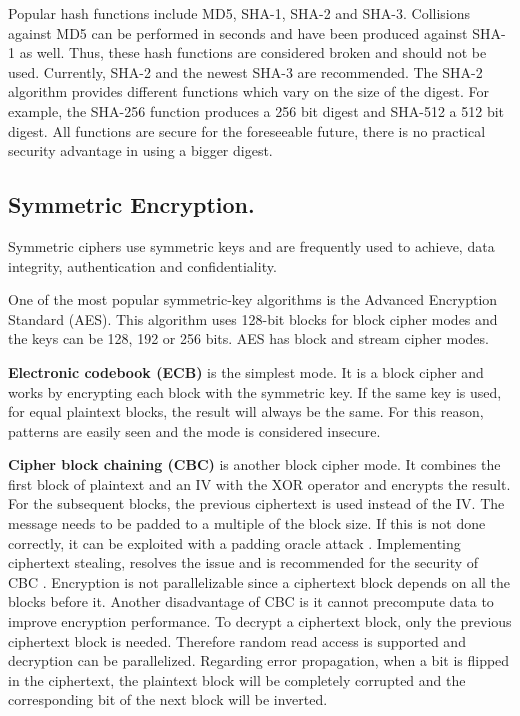 Popular hash functions include MD5, SHA-1, SHA-2 and SHA-3. Collisions against MD5 can be performed in seconds and have been produced against SHA-1 as well. Thus, these hash functions are considered broken and should not be used. Currently, SHA-2 and the newest SHA-3 are recommended. The SHA-2 algorithm provides different functions which vary on the size of the digest. For example, the SHA-256 function produces a 256 bit digest and SHA-512 a 512 bit digest. All functions are secure for the foreseeable future, there is no practical security advantage in using a bigger digest.

\subsection{Symmetric Encryption.}  \label{crypto:symmetric}

Symmetric ciphers use symmetric keys and are frequently used to achieve, data integrity, authentication and confidentiality.

One of the most popular symmetric-key algorithms is the Advanced Encryption Standard (AES). This algorithm uses 128-bit blocks for block cipher modes and the keys can be 128, 192 or 256 bits. AES has block and stream cipher modes.

\textbf{Electronic codebook (ECB)} is the simplest mode. It is a block cipher and works by encrypting each block with the symmetric key. If the same key is used, for equal plaintext blocks, the result will always be the same. For this reason, patterns are easily seen and the mode is considered insecure.

\textbf{Cipher block chaining (CBC)} is another block cipher mode. It combines the first block of plaintext and an IV with the XOR operator and encrypts the result. For the subsequent blocks, the previous ciphertext is used instead of the IV. The message needs to be padded to a multiple of the block size. If this is not done correctly, it can be exploited with a padding oracle attack \cite{paddingoracle}. Implementing ciphertext stealing, resolves the issue and is recommended for the security of CBC \cite{ciphertextstealing}.
Encryption is not parallelizable since a ciphertext block depends on all the blocks before it. Another disadvantage of CBC is it cannot precompute data to improve encryption performance.
To decrypt a ciphertext block, only the previous ciphertext block is needed. Therefore random read access is supported and decryption can be parallelized.
Regarding error propagation, when a bit is flipped in the ciphertext, the plaintext block will be completely corrupted and the corresponding bit of the next block will be inverted.

